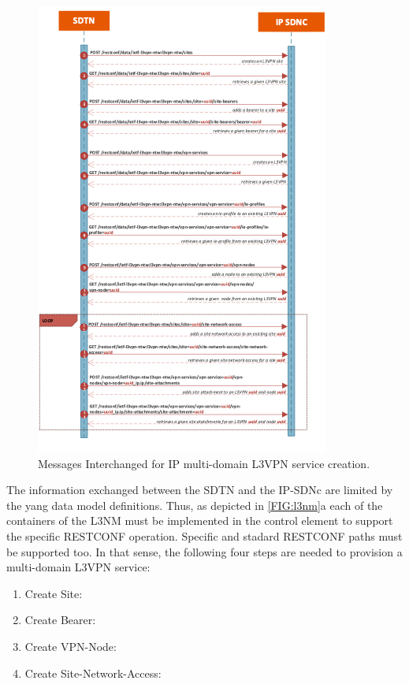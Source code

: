 \documentclass[a4paper,fleqn]{cas-dc}
\begin{document}
\begin{figure}
	\centering
		\includegraphics[width=\linewidth]{figs/l3vpn_workflow.png}
	\caption{Messages Interchanged for IP multi-domain L3VPN service creation.}
	\label{FIG:l3vpn_workflow}
\end{figure}

The information exchanged between the SDTN and the IP-SDNc are limited by the yang data model definitions. Thus, as depicted in \cref{FIG:l3nm}a each of the containers of the L3NM must be implemented in the control element to support the specific RESTCONF operation. Specific and stadard RESTCONF paths must be supported too. In that sense, the following four steps are needed to provision a multi-domain L3VPN service:
\begin{enumerate}
    \item Create Site:
    \item Create Bearer:
    \item Create VPN-Node:
    \item Create Site-Network-Access:
\end{enumerate}
\end{document}
